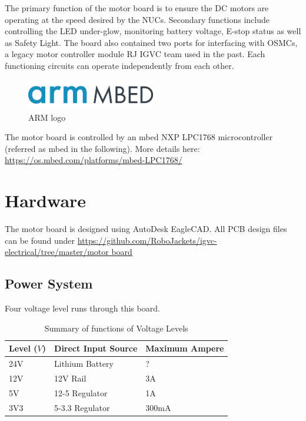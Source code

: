 \documentclass[letterpaper, 12pt]{article}
\begin{document}
The primary function of the motor board is to ensure the DC motors are operating at the speed desired by the NUCs. Secondary functions include controlling the LED under-glow, monitoring battery voltage, E-stop status as well as Safety Light. The board also contained two ports for interfacing with OSMCs, a legacy motor controller module RJ IGVC team used in the past. Each functioning circuits can operate independently from each other. \vspace{6pt}\\

\begin{figure}[h]
\centering
\includegraphics[width=0.5\textwidth]{ARMLogo.png}
\caption{ARM logo}
\end{figure}

The motor board is controlled by an mbed NXP LPC1768 microcontroller (referred as mbed in the following). More details here: \url{https://os.mbed.com/platforms/mbed-LPC1768/} \vspace{6pt}\\
\pagebreak

\section{Hardware}
The motor board is designed using AutoDesk EagleCAD. All PCB design files can be found under \url{https://github.com/RoboJackets/igvc-electrical/tree/master/motor board}
\subsection{Power System}
Four voltage level runs through this board. 
\begin{table}[h]
\caption{Summary of functions of Voltage Levels}
\centering
\begin{tabular}{p{3cm}p{4cm}p{4cm}}
\toprule
Level ($V$)  & Direct Input Source & Maximum Ampere \\
\midrule
24V  & Lithium Battery & ? \\
12V  & 12V Rail & 3A  \\
5V  & 12-5 Regulator & 1A \\
3V3 & 5-3.3 Regulator & 300mA \\
\bottomrule
\end{tabular}
\end{table}
\end{document}
